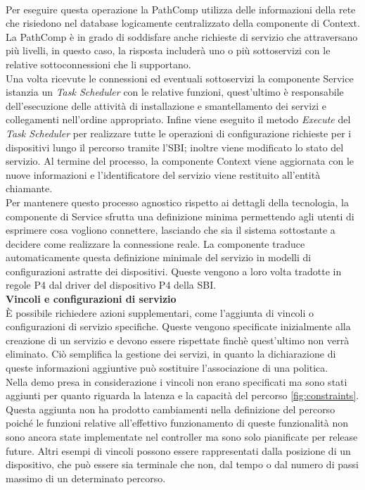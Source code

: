 \\Per eseguire questa operazione la PathComp utilizza delle informazioni della rete che risiedono nel database logicamente centralizzato della componente di Context.
La PathComp è in grado di soddisfare anche richieste di servizio che attraversano più livelli, in questo caso, la risposta includerà uno o più sottoservizi con le relative sottoconnessioni che li supportano.
\\Una volta ricevute le connessioni ed eventuali sottoservizi la componente Service istanzia un \textit{Task Scheduler} con le relative funzioni, %
quest'ultimo è responsabile dell'esecuzione delle attività di installazione e smantellamento dei servizi e collegamenti nell'ordine appropriato.
Infine viene eseguito il metodo \textit{Execute} del \textit{Task Scheduler} per realizzare tutte le operazioni di configurazione richieste per i dispositivi lungo il percorso tramite l'SBI; inoltre viene modificato lo stato del servizio.
Al termine del processo, la componente Context viene aggiornata con le nuove informazioni e l’identificatore del servizio viene restituito all’entità chiamante.
\\Per mantenere questo processo agnostico rispetto ai dettagli della tecnologia, la componente di Service 
sfrutta una definizione minima permettendo agli utenti di esprimere cosa vogliono connettere, lasciando che sia il sistema sottostante a decidere come realizzare la connessione reale.
La componente traduce automaticamente questa definizione minimale del servizio in modelli di configurazioni astratte dei dispositivi. 
Queste vengono a loro volta tradotte in regole P4 dal driver del dispositivo P4 della SBI.
\\\textbf{Vincoli e configurazioni di servizio}
\\È possibile richiedere azioni supplementari, come l'aggiunta di vincoli o configurazioni di servizio specifiche. 
Queste vengono specificate inizialmente alla creazione di un servizio e devono essere rispettate finchè quest'ultimo non verrà eliminato. 
Ciò semplifica la gestione dei servizi, in quanto la dichiarazione di queste informazioni aggiuntive può sostituire l'associazione di una politica.
\\Nella demo presa in considerazione i vincoli non erano specificati ma sono stati aggiunti per quanto riguarda la latenza e la capacità del percorso \ref{fig:constraints}.
Questa aggiunta non ha prodotto cambiamenti nella definizione del percorso poiché le funzioni relative all'effettivo funzionamento di queste funzionalità non 
sono ancora state implementate nel controller ma sono solo pianificate per release future.
Altri esempi di vincoli possono essere rappresentati dalla posizione di un dispositivo, che può essere sia terminale che non, dal tempo o dal numero di passi massimo di un determinato percorso.

